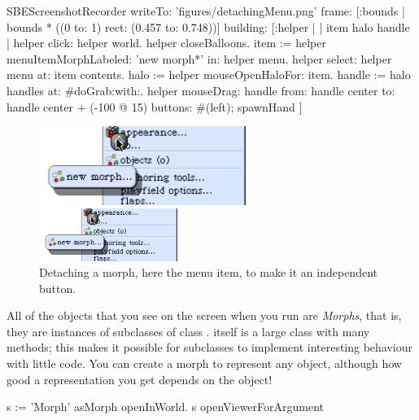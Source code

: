 \documentclass[a4paper,10pt,twoside]{book}
\begin{document}

\begin{ExecuteSmalltalkScript}
SBEScreenshotRecorder writeTo: 'figures/detachingMenu.png' frame: [:bounds | bounds * ((0 to: 1) rect: (0.457 to: 0.748))] building: [:helper |
	| item halo handle |
	helper click: helper world.
	helper closeBalloons.
	item := helper menuItemMorphLabeled: 'new morph*' in: helper menu.
	helper select: helper menu at: item contents.
	halo := helper mouseOpenHaloFor: item.
	handle := halo handles at: #doGrab:with:.
	helper
		mouseDrag: handle
			from: handle center
			to: handle center + (-100 @ 15)
			buttons: #(left);
		spawnHand
]
\end{ExecuteSmalltalkScript}
\begin{figure}[ht]
	\ifluluelse
		{\centerline{\includegraphics[width=0.6\textwidth]{detachingMenu}}}
		{\centerline{\includegraphics[width=0.4\textwidth]{detachingMenu}}}
	\caption{Detaching a morph, here the  menu item, to make it an independent button.
		\label{fig:detachingMenu}}
\end{figure}

All of the objects that you see on the screen when you run \sq are \emph{Morphs}, that is, they are instances of subclasses of class .
\mbox{} itself is a large class with many methods; this makes it possible for subclasses to implement interesting behaviour with little code.
You can create a morph to represent any object, although how good a representation you get depends on the object!

\begin{code}{}
s := 'Morph' asMorph openInWorld.
s openViewerForArgument
\end{code}
\end{document}

